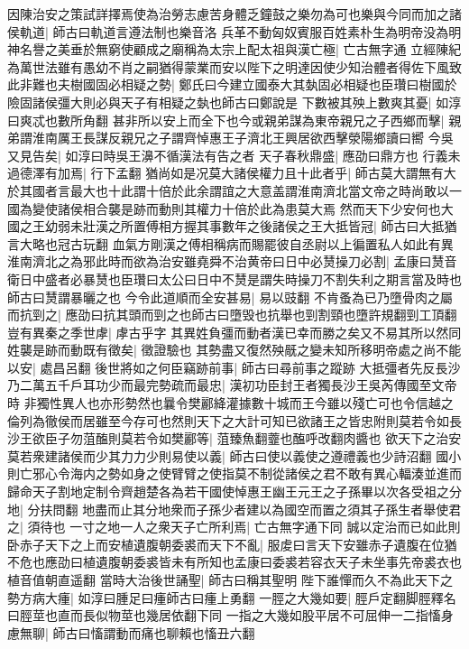 因陳治安之策試詳擇焉使為治勞志慮苦身體乏鐘鼓之樂勿為可也樂與今同而加之諸侯軌道|{
	師古曰軌道言遵法制也樂音洛}
兵革不動匈奴賓服百姓素朴生為明帝没為明神名譽之美垂於無窮使顧成之廟稱為太宗上配太祖與漢亡極|{
	亡古無字通}
立經陳紀為萬世法雖有愚幼不肖之嗣猶得蒙業而安以陛下之明達因使少知治體者得佐下風致此非難也夫樹國固必相疑之勢|{
	鄭氏曰今建立國泰大其埶固必相疑也臣瓚曰樹國於險固諸侯彊大則必與天子有相疑之埶也師古曰鄭說是}
下數被其殃上數爽其憂|{
	如淳曰爽忒也數所角翻}
甚非所以安上而全下也今或親弟謀為東帝親兄之子西鄉而擊|{
	親弟謂淮南厲王長謀反親兄之子謂齊悼惠王子濟北王興居欲西擊滎陽鄉讀曰嚮}
今吳又見告矣|{
	如淳曰時吳王濞不循漢法有告之者}
天子春秋鼎盛|{
	應劭曰鼎方也}
行義未過德澤有加焉|{
	行下孟翻}
猶尚如是况莫大諸侯權力且十此者乎|{
	師古莫大謂無有大於其國者言最大也十此謂十倍於此余謂誼之大意盖謂淮南濟北當文帝之時尚敢以一國為變使諸侯相合襲是跡而動則其權力十倍於此為患莫大焉}
然而天下少安何也大國之王幼弱未壯漢之所置傅相方握其事數年之後諸侯之王大抵皆冠|{
	師古曰大抵猶言大略也冠古玩翻}
血氣方剛漢之傅相稱病而賜罷彼自丞尉以上徧置私人如此有異淮南濟北之為邪此時而欲為治安雖堯舜不治黄帝曰日中必熭操刀必割|{
	孟康曰熭音衛日中盛者必暴熭也臣瓚曰太公曰日中不熭是謂失時操刀不割失利之期言當及時也師古曰熭謂暴曬之也}
今令此道順而全安甚易|{
	易以豉翻}
不肯蚤為已乃墮骨肉之屬而抗剄之|{
	應劭曰抗其頭而剄之也師古曰墮毁也抗舉也剄割頸也墮許規翻剄工頂翻}
豈有異秦之季世虖|{
	虖古乎字}
其異姓負彊而動者漢已幸而勝之矣又不易其所以然同姓襲是跡而動既有徵矣|{
	徵證驗也}
其勢盡又復然殃旤之變未知所移明帝處之尚不能以安|{
	處昌呂翻}
後世將如之何臣竊跡前事|{
	師古曰尋前事之蹤跡}
大抵彊者先反長沙乃二萬五千戶耳功少而最完勢疏而最忠|{
	漢初功臣封王者獨長沙王吳芮傳國至文帝時}
非獨性異人也亦形勢然也曩令樊酈絳灌據數十城而王今雖以殘亡可也令信越之倫列為徹侯而居雖至今存可也然則天下之大計可知已欲諸王之皆忠附則莫若令如長沙王欲臣子勿菹醢則莫若令如樊酈等|{
	菹臻魚翻虀也醢呼改翻肉醬也}
欲天下之治安莫若衆建諸侯而少其力力少則易使以義|{
	師古曰使以義使之遵禮義也少詩沼翻}
國小則亡邪心令海内之勢如身之使臂臂之使指莫不制從諸侯之君不敢有異心輻湊並進而歸命天子割地定制令齊趙楚各為若干國使悼惠王幽王元王之子孫畢以次各受祖之分地|{
	分扶問翻}
地盡而止其分地衆而子孫少者建以為國空而置之須其子孫生者舉使君之|{
	須待也}
一寸之地一人之衆天子亡所利焉|{
	亡古無字通下同}
誠以定治而已如此則卧赤子天下之上而安植遺腹朝委裘而天下不亂|{
	服䖍曰言天下安雖赤子遺腹在位猶不危也應劭曰植遺腹朝委裘皆未有所知也孟康曰委裘若容衣天子未坐事先帝裘衣也植音值朝直遥翻}
當時大治後世誦聖|{
	師古曰稱其聖明}
陛下誰憚而久不為此天下之勢方病大瘇|{
	如淳曰腫足曰瘇師古曰瘇上勇翻}
一脛之大幾如要|{
	脛戶定翻脚脛釋名曰脛莖也直而長似物莖也幾居依翻下同}
一指之大幾如股平居不可屈伸一二指慉身慮無聊|{
	師古曰慉謂動而痛也聊賴也慉丑六翻}
